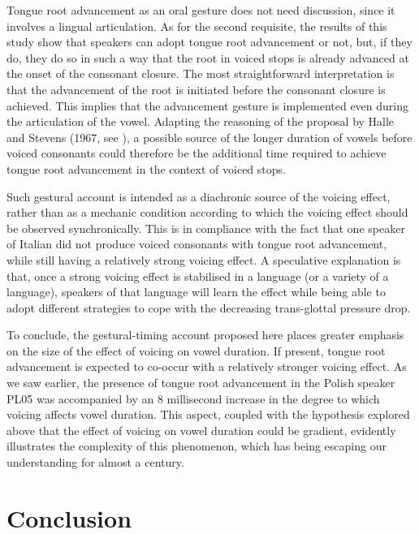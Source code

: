 \documentclass[authoryear, twocolumn]{elsarticle}
\begin{document}
Tongue root advancement as an oral gesture does not need discussion,
since it involves a lingual articulation. As for the second requisite,
the results of this study show that speakers can adopt tongue root
advancement or not, but, if they do, they do so in such a way that the
root in voiced stops is already advanced at the onset of the consonant
closure. The most straightforward interpretation is that the advancement
of the root is initiated before the consonant closure is achieved. This
implies that the advancement gesture is implemented even during the
articulation of the vowel. Adapting the reasoning of the proposal by
Halle and Stevens (1967, see ), a possible source of the
longer duration of vowels before voiced consonants could therefore be
the additional time required to achieve tongue root advancement in the
context of voiced stops.

Such gestural account is intended as a diachronic source of the voicing
effect, rather than as a mechanic condition according to which the
voicing effect should be observed synchronically. This is in compliance
with the fact that one speaker of Italian did not produce voiced
consonants with tongue root advancement, while still having a relatively
strong voicing effect. A speculative explanation is that, once a strong
voicing effect is stabilised in a language (or a variety of a language),
speakers of that language will learn the effect while being able to
adopt different strategies to cope with the decreasing trans-glottal
pressure drop.

To conclude, the gestural-timing account proposed here places greater
emphasis on the size of the effect of voicing on vowel duration. If
present, tongue root advancement is expected to co-occur with a
relatively stronger voicing effect. As we saw earlier, the presence of
tongue root advancement in the Polish speaker PL05 was accompanied by an
8 millisecond increase in the degree to which voicing affects vowel
duration. This aspect, coupled with the hypothesis explored above that
the effect of voicing on vowel duration could be gradient, evidently
illustrates the complexity of this phenomenon, which has being escaping
our understanding for almost a century.

\section{Conclusion}\label{conclusion}

\label{s:conclusion}
\end{document}

